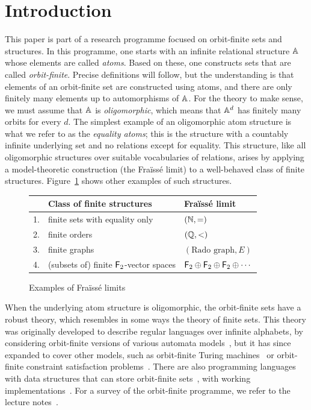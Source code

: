 \section{Introduction}
This paper is part of a research programme focused on orbit-finite sets and structures. 
In this programme, one starts with an infinite relational structure $\mathbb{A}$ whose elements are called \emph{atoms}. 
Based on these, one constructs sets that are called \emph{orbit-finite}. 
Precise definitions will follow, but the understanding is that elements of an orbit-finite set are constructed using atoms, and there are only finitely many elements up to automorphisms of $\mathbb{A}$. 
For the theory to make sense, we must assume that $\mathbb{A}$ is \emph{oligomorphic}, which means that $\mathbb{A}^d$ has finitely many orbits for every $d$. 
The simplest example of an oligomorphic atom structure is what we refer to as the \emph{equality atoms}; 
this is the structure with a countably infinite underlying set and no relations except for equality. 
This structure, like all oligomorphic structures over suitable vocabularies of relations, arises by applying a model-theoretic construction (the Fraïssé limit) to a well-behaved class of finite structures. 
Figure~\ref{fig:fraisse-limits} shows other examples of such structures. 

\begin{figure}
    \begin{tabular}{lll}
   &  Class of finite structures & Fraïssé limit\\
    \toprule
    1.& finite sets with equality only & $(\mathbb{N}, =)$ \\
    2.& finite orders & $(\mathbb{Q}, <)$ \\
    3.& finite graphs & $(\text{Rado graph}, E)$ \\ 
    4.& (subsets of) finite $\mathsf{F}_2$-vector spaces & $\mathsf{F}_2 \oplus \mathsf{F}_2 \oplus \mathsf{F}_2 \oplus \cdots$ 
    \\
    \bottomrule  
\end{tabular}
\caption{\label{fig:fraisse-limits} Examples of Fraïssé limits}
\end{figure}

When the underlying atom structure is oligomorphic, the orbit-finite sets have a robust theory, which resembles in some ways the theory of finite sets. 
This theory was originally developed to describe regular languages over infinite alphabets, by considering orbit-finite versions of various automata models~\cite{bojanczykNominalMonoids2013,bojanczykAutomataTheoryNominal2014}, but it has since expanded to cover other models, such as orbit-finite Turing machines~\cite{bojanczykTuringMachinesAtoms2013} or orbit-finite constraint satisfaction problems~\cite{klin2015locally}.
There are also programming languages with data structures that can store orbit-finite sets~\cite{bojanczyk2012towards,bojanczyk2012imperative}, with working implementations~\cite{kopczynski2016lois, szynwelski-phd}. 
For a survey of the orbit-finite programme, we refer to the lecture notes~\cite{bojanczyk_slightly}. 

